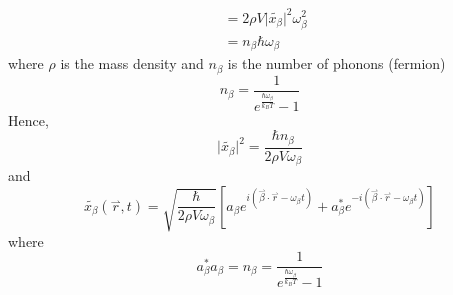 \begin{align}
    & = 2\rho V \big|\widetilde{x_{\beta}}\big|^{2}\omega_{\beta}^{2}\nonumber\\
    & = n_{\beta}\hbar\omega_{\beta}
\end{align} where $\rho$ is the mass density and $n_{\beta}$ is the number of phonons (fermion) \begin{equation}
    n_{\beta} = \frac{1}{e^{\frac{\hbar\omega_{\beta}}{k_{B}T}}-1}
\end{equation} Hence, \begin{equation}
    \big|\widetilde{x_{\beta}}\big|^{2} = \frac{\hbar n_{\beta}}{2\rho V \omega_{\beta}}
\end{equation} and \begin{equation}
    \widetilde{x_{\beta}}(\overset{\rightharpoonup}{r},t) = \sqrt{\frac{\hbar}{2\rho V\omega_{\beta}}}\left[a_{\beta}e^{i(\overset{\rightharpoonup}{\beta}\cdot\overset{\rightharpoonup}{r}-\omega_{\beta}t)}+a_{\beta}^{*}e^{-i(\overset{\rightharpoonup}{\beta}\cdot\overset{\rightharpoonup}{r}-\omega_{\beta}t)}\right]
\end{equation} where \begin{equation}
    a_{\beta}^{*}a_{\beta} = n_{\beta} = \frac{1}{e^{\frac{\hbar\omega_{\beta}}{k_{B}T}}-1}
\end{equation}
